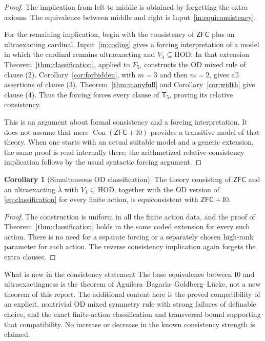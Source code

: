 \documentclass[11pt,letterpaper]{article}
\theoremstyle{definition}
\newtheorem{corollary}[definition]{Corollary}
\numberwithin{equation}{section}
\newcommand{\ZFC}{\mathsf{ZFC}}
\newcommand{\HOD}{\mathrm{HOD}}
\newcommand{\Con}{\operatorname{Con}}
\newcommand{\Izero}{\mathrm{I0}}
\newcommand{\Tfive}{\mathsf{T}_5}
\begin{document}
\begin{proof}
The implication from left to middle is obtained by forgetting the extra axioms. The equivalence between middle and right is Input~\ref{in:equiconsistency}.

For the remaining implication, begin with the consistency of $\ZFC$ plus an ultraexacting cardinal. Input~\ref{in:coding} gives a forcing interpretation of a model in which the cardinal remains ultraexacting and $V_\lambda\subseteq\HOD$. In that extension Theorem~\ref{thm:classification}, applied to $F_5$, constructs the OD mixed rule of clause (2). Corollary~\ref{cor:forbidden}, with $m=3$ and then $m=2$, gives all assertions of clause (3). Theorem~\ref{thm:manyfull} and Corollary~\ref{cor:width} give clause (4). Thus the forcing forces every clause of $\Tfive$, proving its relative consistency.

This is an argument about formal consistency and a forcing interpretation. It does not assume that mere $\Con(\ZFC+\Izero)$ provides a transitive model of that theory. When one starts with an actual suitable model and a generic extension, the same proof is read internally there; the arithmetized relative-consistency implication follows by the usual syntactic forcing argument.
\end{proof}

\begin{corollary}[Simultaneous OD classification]\label{cor:allactions}
The theory consisting of $\ZFC$ and an ultraexacting $\lambda$ with $V_\lambda\subseteq\HOD$, together with the OD version of \eqref{eq:classification} for every finite action, is equiconsistent with $\ZFC+\Izero$.
\end{corollary}

\begin{proof}
The construction is uniform in all the finite action data, and the proof of Theorem~\ref{thm:classification} holds in the same coded extension for every such action. There is no need for a separate forcing or a separately chosen high-rank parameter for each action. The reverse consistency implication again forgets the extra clauses.
\end{proof}

\begin{assessment}{What is new in the consistency statement}
The base equivalence between $\Izero$ and ultraexactingness is the theorem of Aguilera--Bagaria--Goldberg--L\"ucke, not a new theorem of this report. The additional content here is the proved compatibility of an explicit, nontrivial OD mixed symmetry rule with strong failures of definable choice, and the exact finite-action classification and transversal bound supporting that compatibility. No increase or decrease in the known consistency strength is claimed.
\end{assessment}
\end{document}
